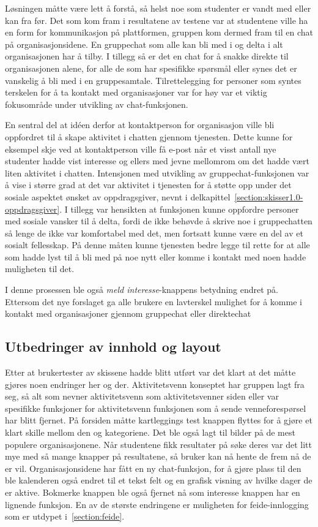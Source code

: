 Løsningen måtte være lett å forstå, så helst noe som studenter er vandt med eller kan fra før. Det som kom fram i resultatene av testene var at studentene ville ha en form for kommunikasjon på plattformen, gruppen kom dermed fram til en chat på organisasjonsidene. En gruppechat som alle kan bli med i og delta i alt organisasjonen har å tilby. I tillegg så er det en chat for å snakke direkte til organisasjonen alene, for alle de som har spesifikke spørsmål eller synes det er vanskelig å bli med i en gruppesamtale. Tilrettelegging for personer som syntes terskelen for å ta kontakt med organisasjoner var for høy var et viktig fokusområde under utvikling av chat-funksjonen. 

En sentral del at idéen derfor at kontaktperson for organisasjon ville bli oppfordret til å skape aktivitet i chatten gjennom tjenesten. Dette kunne for eksempel skje ved at kontaktperson ville få e-post når et visst antall nye studenter hadde vist interesse og ellers med jevne mellomrom om det hadde vært liten aktivitet i chatten. Intensjonen med utvikling av gruppechat-funksjonen var å vise i større grad at det var aktivitet i tjenesten for å støtte opp under det sosiale aspektet ønsket av oppdragsgiver, nevnt i delkapittel~\ref{section:skisser1.0-oppdragsgiver}. I tillegg var hensikten at funksjonen kunne oppfordre personer med sosiale vansker til å delta, fordi de ikke behøvde å skrive noe i gruppechatten så lenge de ikke var komfortabel med det, men fortsatt kunne være en del av et sosialt fellesskap. På denne måten kunne tjenesten bedre legge til rette for at alle som hadde lyst til å bli med på noe nytt eller komme i kontakt med noen hadde muligheten til det.

I denne prosessen ble også {\em meld interesse}-knappens betydning endret på. Ettersom det nye forslaget ga alle brukere en lavterskel mulighet for å komme i kontakt med organisasjoner gjennom gruppechat eller direktechat

\subsection{Utbedringer av innhold og layout}
Etter at brukertester av skissene hadde blitt utført var det klart at det måtte gjøres noen endringer her og der. Aktivitetsvenn konseptet har gruppen lagt fra seg, så alt som nevner aktivitetsvenn som aktivitetsvenner siden eller var spesifikke funksjoner for aktivitetsvenn funksjonen som å sende venneforespørsel har blitt fjernet. På forsiden måtte kartleggings test knappen flyttes for å gjøre et klart skille mellom den og kategoriene. Det ble også lagt til bilder på de mest populere organisasjonene. Når studentene fikk resultater på søke deres var det litt mye med så mange knapper på resultatene, så bruker kan nå hente de frem nå de er vil. Organisasjonsidene har fått en ny chat-funksjon, for å gjøre plass til den ble kalenderen også endret til et tekst felt og en grafisk visning av hvilke dager de er aktive. Bokmerke knappen ble også fjernet nå som interesse knappen har en lignende funksjon. En av de største endringene er muligheten for feide-innlogging som er utdypet i~\ref{section:feide}. 


